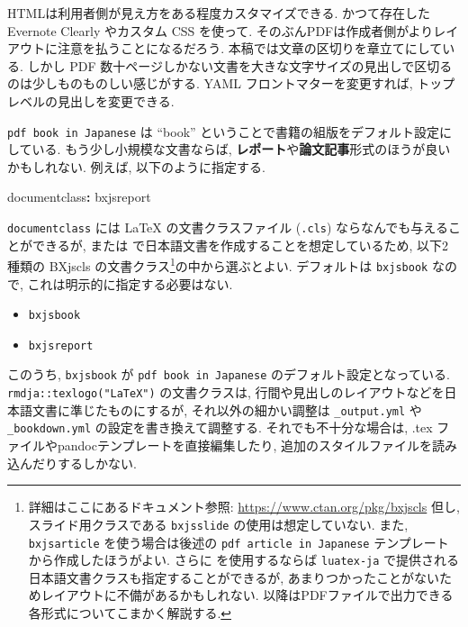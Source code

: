 \documentclass[
]{bxjsbook}
\newenvironment{Shaded}{\begin{snugshade}}{\end{snugshade}}
\newcommand{\AttributeTok}[1]{\textcolor[rgb]{0.77,0.63,0.00}{#1}}
\newcommand{\FunctionTok}[1]{\textcolor[rgb]{0.00,0.00,0.00}{#1}}
\newcommand{\KeywordTok}[1]{\textcolor[rgb]{0.13,0.29,0.53}{\textbf{#1}}}
\providecommand{\tightlist}{%
  \setlength{\itemsep}{0pt}\setlength{\parskip}{0pt}}
\theoremstyle{definition}
\theoremstyle{definition}
\theoremstyle{definition}
\theoremstyle{remark}
\begin{document}
HTMLは利用者側が見え方をある程度カスタマイズできる. かつて存在した
Evernote Clearly やカスタム CSS を使って.
そのぶんPDFは作成者側がよりレイアウトに注意を払うことになるだろう.
本稿では文章の区切りを章立てにしている. しかし PDF
数十ページしかない文書を大きな文字サイズの見出しで区切るのは少しものものしい感じがする.
YAML フロントマターを変更すれば, トップレベルの見出しを変更できる.

\texttt{pdf\ book\ in\ Japanese} は ``book''
ということで書籍の組版をデフォルト設定にしている.
もう少し小規模な文書ならば,
\textbf{レポート}や\textbf{論文記事}形式のほうが良いかもしれない.
例えば, 以下のように指定する.

\begin{Shaded}
\begin{Highlighting}[]
\FunctionTok{documentclass}\KeywordTok{:}\AttributeTok{ bxjsreport}
\end{Highlighting}
\end{Shaded}

\texttt{documentclass} には LaTeX の文書クラスファイル (\texttt{.cls})
ならなんでも与えることができるが, \XeLaTeX または
\LuaLaTeX で日本語文書を作成することを想定しているため, 以下2種類の
BXjscls の文書クラス\footnote{詳細はここにあるドキュメント参照:
  \url{https://www.ctan.org/pkg/bxjscls} 但し, スライド用クラスである
  \texttt{bxjsslide} の使用は想定していない. また, \texttt{bxjsarticle}
  を使う場合は後述の \texttt{pdf\ article\ in\ Japanese}
  テンプレートから作成したほうがよい. さらに \LuaLaTeX を使用するならば
  \texttt{luatex-ja}
  で提供される日本語文書クラスも指定することができるが,
  あまりつかったことがないためレイアウトに不備があるかもしれない.
  以降はPDFファイルで出力できる各形式についてこまかく解説する.}の中から選ぶとよい.
デフォルトは \texttt{bxjsbook} なので, これは明示的に指定する必要はない.

\begin{itemize}
\tightlist
\item
  \texttt{bxjsbook}
\item
  \texttt{bxjsreport}
\end{itemize}

このうち, \texttt{bxjsbook} が \texttt{pdf\ book\ in\ Japanese}
のデフォルト設定となっている. \texttt{rmdja::texlogo("LaTeX")}
の文書クラスは,
行間や見出しのレイアウトなどを日本語文書に準じたものにするが,
それ以外の細かい調整は \texttt{\_output.yml} や \texttt{\_bookdown.yml}
の設定を書き換えて調整する. それでも不十分な場合は, .tex
ファイルやpandocテンプレートを直接編集したり,
追加のスタイルファイルを読み込んだりするしかない.
\end{document}
